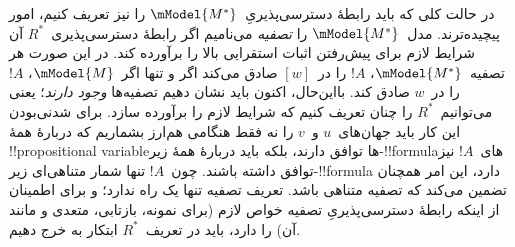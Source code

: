\documentclass[../../../include/open-logic-section]{subfiles}
\begin{document}
در حالت کلی که باید رابطهٔ دسترسی‌پذیریِ~$\mModel{M^*}$ را نیز تعریف
کنیم، امور پیچیده‌ترند. مدل~$\mModel{M^*}$ را \emph{تصفیه} می‌نامیم
اگر رابطهٔ دسترسی‌پذیری~$R^*$ آن شرایط لازم برای پیش‌رفتن اثبات
استقرایی بالا را برآورده کند. در این صورت هر تصفیه~$\mModel{M^*}$،
$!A$ را در~$[w]$ صادق می‌کند اگر و تنها اگر~$\mModel{M}$، $!A$ را
در~$w$ صادق کند. بااین‌حال، اکنون باید نشان دهیم تصفیه‌ها \emph{وجود
دارند}؛ یعنی می‌توانیم~$R^*$ را چنان تعریف کنیم که شرایط لازم را
برآورده سازد. برای شدنی‌بودن این کار باید جهان‌های~$u$ و~$v$ را نه
فقط هنگامی هم‌ارز بشماریم که دربارهٔ همهٔ !!{propositional variable}ها
توافق دارند، بلکه باید دربارهٔ همهٔ زیر-!!{formula}های~$!A$ نیز توافق
داشته باشند. چون~$!A$ تنها شمار متناهی‌ای زیر-!!{formula} دارد، این
امر همچنان تضمین می‌کند که تصفیه متناهی باشد. تعریف تصفیه تنها یک راه
ندارد؛ و برای اطمینان از اینکه رابطهٔ دسترسی‌پذیریِ تصفیه خواص لازم
(برای نمونه، بازتابی، متعدی و مانند آن) را دارد، باید در تعریف~$R^*$
ابتکار به خرج دهیم.
\end{document}
